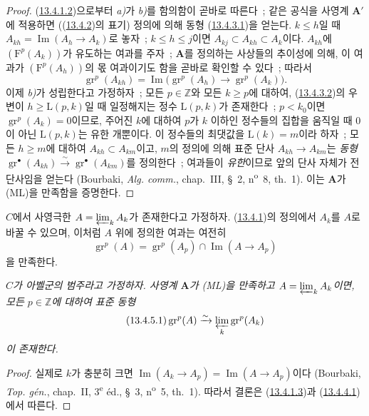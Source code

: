 \begin{proof}
(\hyperref[0.13.4.1.2-fr]{13.4.1.2})으로부터 \emph{a)}가 \emph{b)}를
함의함이 곧바로 따른다~; 같은 공식을 사영계 $\mathbf A'$에 적용하면
((\hyperref[0.13.4.2-fr]{13.4.2})의 표기) 정의에 의해 동형
(\hyperref[0.13.4.3.1-fr]{13.4.3.1})을 얻는다. $k\leq h$일 때
$A_{kh}=\operatorname{Im}(A_h\to A_k)$로 놓자~; $k\leq h\leq j$이면
$A_{kj}\subset A_{kh}\subset A_k$이다. $A_{kh}$에
$(\mathrm F^p(A_k))$가 유도하는 여과를 주자~; $\mathbf A$를 정의하는
사상들의 추이성에 의해, 이 여과가 $(\mathrm F^p(A_h))$의 몫 여과이기도
함을 곧바로 확인할 수 있다~; 따라서
\begin{equation}
\label{0.13.4.3.2-fr}
\tag{13.4.3.2}
\operatorname{gr}^p(A_{kh})=
\operatorname{Im}\bigl(\operatorname{gr}^p(A_h)\longrightarrow
\operatorname{gr}^p(A_k)\bigr).
\end{equation}
이제 \emph{b)}가 성립한다고 가정하자~; 모든 $p\in\mathbb Z$와 모든
$k\geq p$에 대하여, (\hyperref[0.13.4.3.2-fr]{13.4.3.2})의 우변이
$h\geq\mathrm L(p,k)$일 때 일정해지는 정수 $\mathrm L(p,k)$가
존재한다~; $p<k_0$이면 $\operatorname{gr}^p(A_k)=0$이므로, 주어진
$k$에 대하여 $p$가 $k$ 이하인 정수들의 집합을 움직일 때 0이 아닌
$\mathrm L(p,k)$는 유한 개뿐이다. 이 정수들의 최댓값을
$\mathrm L(k)=m$이라 하자~; 모든 $h\geq m$에 대하여
$A_{kh}\subset A_{km}$이고, $m$의 정의에 의해 표준 단사
$A_{kh}\to A_{km}$는 \emph{동형}
$\operatorname{gr}^\bullet(A_{kh})\xrightarrow{\sim}
\operatorname{gr}^\bullet(A_{km})$를 정의한다~; 여과들이 \emph{유한}이므로
앞의 단사 자체가 전단사임을 얻는다 (Bourbaki, \emph{Alg. comm.},
chap.~III, §~2, n\textsuperscript{o}~8, th.~1). 이는 $\mathbf A$가
(ML)을 만족함을 증명한다.
\end{proof}

\begin{env}[13.4.4]
\label{0.13.4.4-fr}
$C$에서 사영극한 $A=\varprojlim_k A_k$가 존재한다고 가정하자.
(\hyperref[0.13.4.1-fr]{13.4.1})의 정의에서 $A_k$를 $A$로 바꿀 수
있으며, 이처럼 $A$ 위에 정의한 여과는 여전히
\begin{equation}
\label{0.13.4.4.1-fr}
\tag{13.4.4.1}
\operatorname{gr}^p(A)=\operatorname{gr}^p(A_p)
\cap\operatorname{Im}(A\longrightarrow A_p)
\end{equation}
을 만족한다.
\end{env}

\begin{corollary}[13.4.5]
\label{0.13.4.5-fr}
\emph{$C$가 아벨군의 범주라고 가정하자. 사영계 $\mathbf A$가 (ML)을
만족하고 $A=\varprojlim_k A_k$이면, 모든 $p\in\mathbb Z$에 대하여
표준 동형}
\begin{equation}
\label{0.13.4.5.1-fr}
\tag{13.4.5.1}
\operatorname{gr}^p(A)\xrightarrow{\sim}
\varprojlim_k\operatorname{gr}^p(A_k)
\end{equation}
\emph{이 존재한다.}
\end{corollary}
\begin{proof}
실제로 $k$가 충분히 크면
$\operatorname{Im}(A_k\to A_p)=\operatorname{Im}(A\to A_p)$이다
(Bourbaki, \emph{Top. gén.}, chap.~II,
3\textsuperscript{e} éd., §~3, n\textsuperscript{o}~5, th.~1). 따라서
결론은 (\hyperref[0.13.4.1.3-fr]{13.4.1.3})과
(\hyperref[0.13.4.4.1-fr]{13.4.4.1})에서 따른다.
\end{proof}

